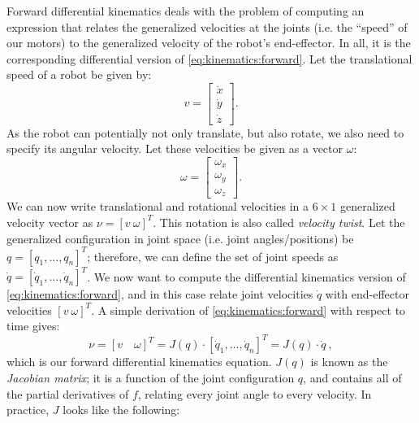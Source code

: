Forward differential kinematics deals with the problem of computing an expression that relates the generalized velocities at the joints (i.e. the ``speed'' of our motors) to the generalized velocity of the robot's end-effector. In all, it is the corresponding differential version of \cref{eq:kinematics:forward}.
Let the translational speed of a robot be given by:
\begin{equation}
v=\left[\begin{array}{c}
\dot{x}\\
\dot{y}\\
\dot{z}
\end{array}
\right].
\end{equation}
As the robot can potentially not only translate, but also rotate, we also need to specify its angular velocity. Let these velocities be given as a vector $\omega$:
\begin{equation}
\omega=\left[\begin{array}{c}
\omega_x\\
\omega_y\\
\omega_z
\end{array}
\right].
\end{equation}
We can now write translational and rotational velocities in a $6\times1$ generalized velocity vector as $\nu = [v \ \omega]^T$.
This notation is also called \textsl{velocity twist}. %
Let the generalized configuration in joint space (i.e. joint angles/positions) be $q=[q_1, \ldots, q_n]^T$; therefore, we can define the set of joint speeds as $\dot{q}=[\dot{q}_1, \ldots, \dot{q}_n]^T$.
%
We now want to compute the differential kinematics version of \cref{eq:kinematics:forward}, and in this case relate joint velocities $\dot{q}$ with end-effector velocities $[v \ \omega]^T$. A simple derivation of \cref{eq:kinematics:forward} with respect to time gives:
\begin{equation}\label{eq:kinematics:diff:fwd:short}
\nu = [v \quad \omega]^T=J(q)\cdot [\dot{q}_1,\ldots,\dot{q}_n]^T = J(q) \cdot \dot{q} \ ,
\end{equation}
which is our forward differential kinematics equation. $J(q)$ is known as the \textsl{Jacobian matrix}; it is a function of the joint configuration $q$, and contains all of the partial derivatives of $f$, relating every joint angle to every velocity. In practice, $J$ looks like the following:

